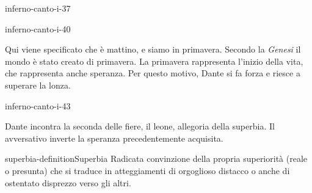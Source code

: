 \documentclass[preview]{standalone}
\begin{document}
\begin{snippet}{inferno-canto-i-37}

\end{snippet}

\begin{snippet}{inferno-canto-i-40}

    Qui viene specificato che è mattino, e siamo in primavera.
    Secondo la \textit{Genesi} il mondo è stato creato di primavera.
    La primavera rappresenta l'inizio della vita, che rappresenta anche speranza.
    Per questo motivo, Dante si fa forza e riesce a superare la lonza.
\end{snippet}

\begin{snippet}{inferno-canto-i-43}

    Dante incontra la seconda delle fiere, il leone, allegoria della superbia.
    Il  avversativo inverte la speranza precedentemente acquisita.
\end{snippet}

\begin{snippetdefinition}{superbia-definition}{Superbia}
    Radicata convinzione della propria superiorità (reale o presunta) che si traduce in atteggiamenti di orgoglioso distacco o anche di ostentato disprezzo verso gli altri.
\end{snippetdefinition}
\end{document}
